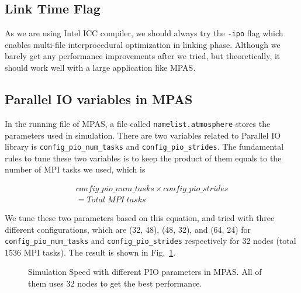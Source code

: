 \subsection{Link Time Flag}
As we are using Intel ICC compiler, we should always try the \texttt{-ipo} flag which enables multi-file interprocedural optimization in linking phase. Although we barely get any performance improvements after we tried, but theoretically, it should work well with a large application like MPAS.

\subsection{Parallel IO variables in MPAS}

In the running file of MPAS, a file called \texttt{namelist.atmosphere} stores the parameters used in simulation. There are two variables related to Parallel IO library is \texttt{config\_pio\_num\_tasks} and \texttt{config\_pio\_strides}. The fundamental rules to tune these two variables is to keep the product of them equals to the number of MPI tasks we used, which is

\begin{align*}
     config\_pio\_num\_tasks \times config\_pio\_strides\\
    = Total\;MPI\;tasks
\end{align*}

We tune these two parameters based on this equation, and tried with three different configurations, which are (32, 48), (48, 32), and (64, 24) for \texttt{config\_pio\_num\_tasks} and \texttt{config\_pio\_strides} respectively for 32 nodes (total 1536 MPI tasks). The result is shown in Fig.~\ref{fig:config-pio}.

\begin{figure}[htb]
    \centering
    \caption{Simulation Speed with different PIO parameters in MPAS. All of them uses 32 nodes to get the best performance.}
    \label{fig:config-pio}
\end{figure}

